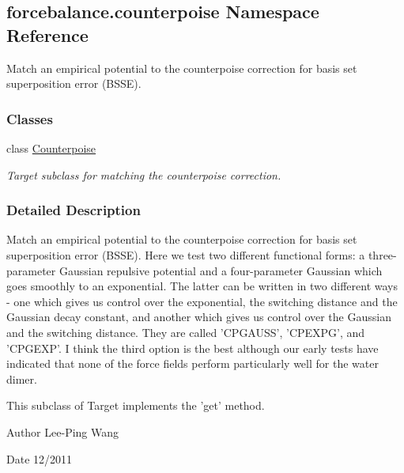 \hypertarget{namespaceforcebalance_1_1counterpoise}{\subsection{forcebalance.\-counterpoise Namespace Reference}
\label{namespaceforcebalance_1_1counterpoise}
}


Match an empirical potential to the counterpoise correction for basis set superposition error (B\-S\-S\-E).  


\subsubsection*{Classes}
\begin{DoxyCompactItemize}
\item 
class \hyperlink{classforcebalance_1_1counterpoise_1_1Counterpoise}{Counterpoise}
\begin{DoxyCompactList}\small\item\em Target subclass for matching the counterpoise correction. \end{DoxyCompactList}\end{DoxyCompactItemize}


\subsubsection{Detailed Description}
Match an empirical potential to the counterpoise correction for basis set superposition error (B\-S\-S\-E). Here we test two different functional forms\-: a three-\/parameter Gaussian repulsive potential and a four-\/parameter Gaussian which goes smoothly to an exponential. The latter can be written in two different ways -\/ one which gives us control over the exponential, the switching distance and the Gaussian decay constant, and another which gives us control over the Gaussian and the switching distance. They are called 'C\-P\-G\-A\-U\-S\-S', 'C\-P\-E\-X\-P\-G', and 'C\-P\-G\-E\-X\-P'. I think the third option is the best although our early tests have indicated that none of the force fields perform particularly well for the water dimer.

This subclass of Target implements the 'get' method.

\begin{DoxyAuthor}{Author}
Lee-\/\-Ping Wang 
\end{DoxyAuthor}
\begin{DoxyDate}{Date}
12/2011 
\end{DoxyDate}
